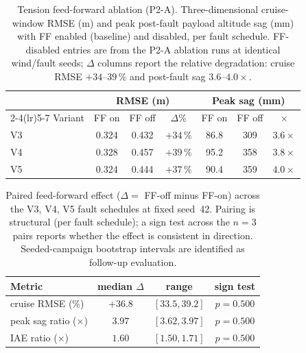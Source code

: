 \begin{table}[htbp]
  \caption{%
    Tension feed-forward ablation (P2-A). Three-dimensional cruise-window RMSE (m) and peak post-fault payload altitude sag (mm) with FF enabled (baseline) and disabled, per fault schedule. FF-disabled entries are from the P2-A ablation runs at identical wind/fault seeds; $\Delta$ columns report the relative degradation: cruise RMSE $+34$--$39\,\%$ and post-fault sag $3.6$--$4.0\times$.%
  }
  \label{tab:ff-ablation}
  \centering
  \small
  \renewcommand{\arraystretch}{1.05}
  \begin{tabular}{lcccccc}
    \toprule
    & \multicolumn{3}{c}{RMSE (m)} & \multicolumn{3}{c}{Peak sag (mm)} \\
    \cmidrule(lr){2-4}\cmidrule(lr){5-7}
    Variant & FF on & FF off & $\Delta$\% & FF on & FF off & $\times$ \\
    \midrule
    V3 & 0.324 & 0.432 & $+34\,\%$ & 86.8 & 309 & $3.6\times$ \\
    V4 & 0.328 & 0.457 & $+39\,\%$ & 95.2 & 358 & $3.8\times$ \\
    V5 & 0.324 & 0.444 & $+37\,\%$ & 90.4 & 359 & $4.0\times$ \\
    \bottomrule
  \end{tabular}
\end{table}

\begin{table}[htbp]
  \caption{%
    Paired feed-forward effect ($\Delta = $ FF-off minus FF-on) across the V3, V4, V5 fault schedules at
    fixed seed~42. Pairing is structural (per fault schedule); a sign test across the $n=3$ pairs reports
    whether the effect is consistent in direction. Seeded-campaign bootstrap intervals are identified as
    follow-up evaluation.%
  }
  \label{tab:paired-delta}
  \centering
  \small
  \begin{tabular}{lccc}
    \toprule
    Metric & median $\Delta$ & range & sign test \\
    \midrule
    cruise RMSE (\%) & $+36.8$ & $[33.5, 39.2]$ & $p=0.500$ \\
    peak sag ratio (\(\times\)) & $3.97$ & $[3.62, 3.97]$ & $p=0.500$ \\
    IAE ratio (\(\times\)) & $1.60$ & $[1.50, 1.71]$ & $p=0.500$ \\
    \bottomrule
  \end{tabular}
\end{table}

